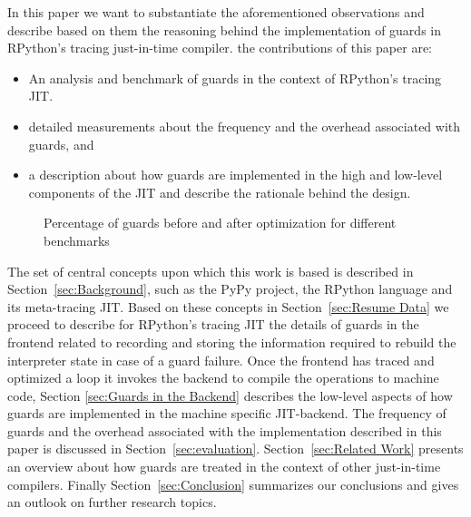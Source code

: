 \documentclass[10pt,preprint]{sigplanconf}
\begin{document}
In this paper we want to substantiate the aforementioned observations and
describe based on them the reasoning behind the implementation of guards in
RPython's tracing just-in-time compiler. the contributions of this paper are:
\begin{itemize}
  \item An analysis and benchmark of guards in the context of RPython's tracing JIT.
  \item detailed measurements about the frequency and the
  overhead associated with guards, and
  \item a description about how guards are implemented in the high\-
  and low-level components of the JIT and describe the rationale behind the design.
\end{itemize}

\begin{figure}
    
    \caption{Percentage of guards before and after optimization for different benchmarks}
    \label{fig:guard_percent}
\end{figure}

The set of central concepts upon which this work is based is described in
Section~\ref{sec:Background}, such as the PyPy project, the RPython language
and its meta-tracing JIT. Based on these concepts in Section~\ref{sec:Resume
Data} we proceed to describe for RPython's tracing JIT the details of guards in
the frontend related to recording and storing the
information required to rebuild the interpreter state in case of a guard
failure. Once the frontend has traced and optimized a loop it invokes the
backend to compile the operations to machine code, Section \ref{sec:Guards in
the Backend} describes the low-level aspects of how guards are implemented in
the machine specific JIT-backend. The frequency of guards and the overhead associated with the
implementation described in this paper is discussed in
Section~\ref{sec:evaluation}. Section~\ref{sec:Related Work} presents an
overview about how guards are treated in the context of other just-in-time
compilers. Finally Section~\ref{sec:Conclusion} summarizes our conclusions and
gives an outlook on further research topics.
\end{document}
